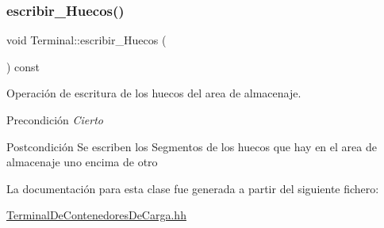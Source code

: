 \subsubsection{\texorpdfstring{escribir\+\_\+\+Huecos()}{escribir\_Huecos()}}
{\footnotesize\ttfamily void Terminal\+::escribir\+\_\+\+Huecos (\begin{DoxyParamCaption}{ }\end{DoxyParamCaption}) const}



Operación de escritura de los huecos del area de almacenaje. 

\begin{DoxyPrecond}{Precondición}
{\itshape Cierto} 
\end{DoxyPrecond}
\begin{DoxyPostcond}{Postcondición}
Se escriben los Segmentos de los huecos que hay en el area de almacenaje uno encima de otro 
\end{DoxyPostcond}


La documentación para esta clase fue generada a partir del siguiente fichero\+:\begin{DoxyCompactItemize}
\item 
\hyperlink{_terminal_de_contenedores_de_carga_8hh}{Terminal\+De\+Contenedores\+De\+Carga.\+hh}\end{DoxyCompactItemize}
